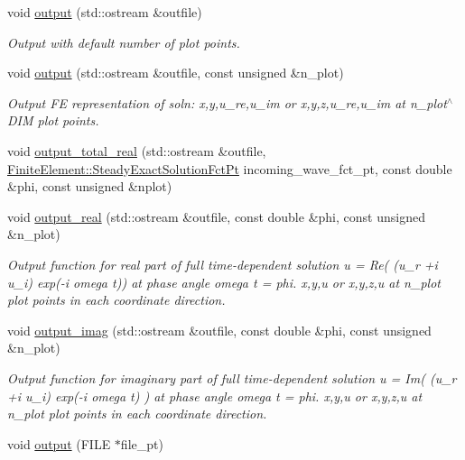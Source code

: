 \begin{DoxyCompactItemize}
void \hyperlink{classoomph_1_1PMLHelmholtzEquationsBase_ad13677aed8be5a42b31a1f8d4f520d35}{output} (std\+::ostream \&outfile)
\begin{DoxyCompactList}\small\item\em Output with default number of plot points. \end{DoxyCompactList}\item 
void \hyperlink{classoomph_1_1PMLHelmholtzEquationsBase_a904736450d231513640224020566460f}{output} (std\+::ostream \&outfile, const unsigned \&n\+\_\+plot)
\begin{DoxyCompactList}\small\item\em Output FE representation of soln\+: x,y,u\+\_\+re,u\+\_\+im or x,y,z,u\+\_\+re,u\+\_\+im at n\+\_\+plot$^\wedge$\+D\+IM plot points. \end{DoxyCompactList}\item 
void \hyperlink{classoomph_1_1PMLHelmholtzEquationsBase_a1a5c423fc22940d1edb8c623266421de}{output\+\_\+total\+\_\+real} (std\+::ostream \&outfile, \hyperlink{classoomph_1_1FiniteElement_a690fd33af26cc3e84f39bba6d5a85202}{Finite\+Element\+::\+Steady\+Exact\+Solution\+Fct\+Pt} incoming\+\_\+wave\+\_\+fct\+\_\+pt, const double \&phi, const unsigned \&nplot)
\item 
void \hyperlink{classoomph_1_1PMLHelmholtzEquationsBase_a823895b9525cf2ddb30517a64dc61a85}{output\+\_\+real} (std\+::ostream \&outfile, const double \&phi, const unsigned \&n\+\_\+plot)
\begin{DoxyCompactList}\small\item\em Output function for real part of full time-\/dependent solution u = Re( (u\+\_\+r +i u\+\_\+i) exp(-\/i omega t)) at phase angle omega t = phi. x,y,u or x,y,z,u at n\+\_\+plot plot points in each coordinate direction. \end{DoxyCompactList}\item 
void \hyperlink{classoomph_1_1PMLHelmholtzEquationsBase_a10e17c59371c3c3f1e7a1001837838ce}{output\+\_\+imag} (std\+::ostream \&outfile, const double \&phi, const unsigned \&n\+\_\+plot)
\begin{DoxyCompactList}\small\item\em Output function for imaginary part of full time-\/dependent solution u = Im( (u\+\_\+r +i u\+\_\+i) exp(-\/i omega t) ) at phase angle omega t = phi. x,y,u or x,y,z,u at n\+\_\+plot plot points in each coordinate direction. \end{DoxyCompactList}\item 
void \hyperlink{classoomph_1_1PMLHelmholtzEquationsBase_acabc2ace55a6f69cd3ef62fe82dc1790}{output} (F\+I\+LE $\ast$file\+\_\+pt)

\end{DoxyCompactItemize}

